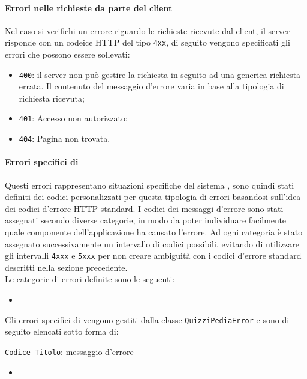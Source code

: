 \paragraph{Errori nelle richieste da parte del client}
Nel caso si verifichi un errore riguardo le richieste ricevute dal client, il server risponde con un codeice HTTP del tipo \texttt{4xx}, di seguito vengono specificati gli errori che possono essere sollevati:
	\begin{itemize}
		\item \texttt{400}: il server non può gestire la richiesta in seguito ad una generica richiesta errata. Il contenuto del messaggio d'errore varia in base alla tipologia di richiesta ricevuta;
		\item \texttt{401}: Accesso non autorizzato;
		\item \texttt{404}: Pagina non trovata.
	\end{itemize}
\paragraph{Errori specifici di \progetto}
Questi errori rappresentano situazioni specifiche del sistema \progetto, sono quindi stati definiti dei codici personalizzati per questa tipologia di errori basandosi sull'idea dei codici d'errore HTTP standard. I codici dei messaggi d'errore sono stati assegnati secondo diverse categorie, in modo da poter individuare facilmente quale componente dell'applicazione ha causato l'errore. Ad ogni categoria è stato assegnato successivamente un intervallo di codici possibili, evitando di utilizzare gli intervalli \texttt{4xxx} e \texttt{5xxx} per non creare ambiguità con i codici d'errore standard descritti nella sezione precedente. \\
Le categorie di errori definite sono le seguenti:
\begin{itemize}
	\item 
\end{itemize}
Gli errori specifici di \textit{\progetto} vengono gestiti dalla classe \texttt{QuizziPediaError} e sono di seguito elencati sotto forma di:
\begin{center}
	\texttt{Codice Titolo}: messaggio d'errore
\end{center}
\begin{itemize}
	\item 
\end{itemize}

